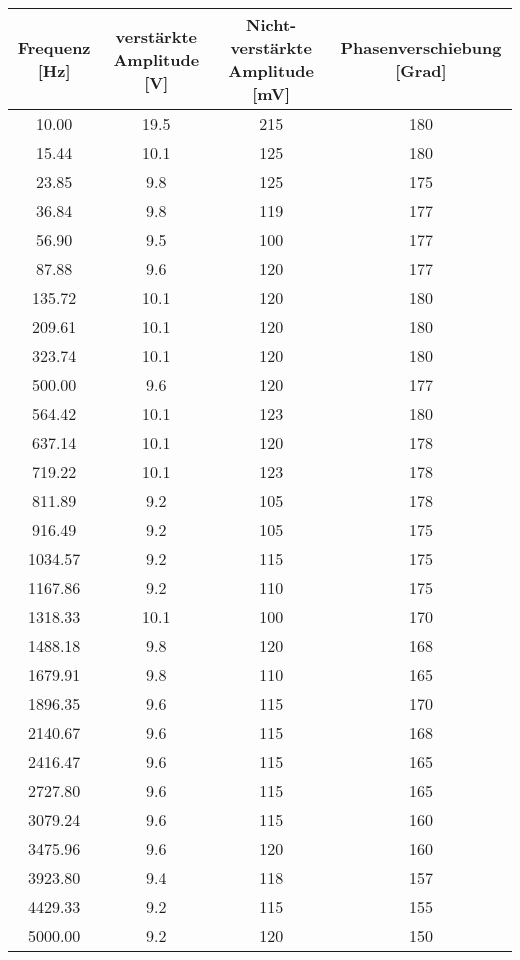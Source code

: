 \begin{tabular}{cccc}
    \toprule
    Frequenz [Hz] & verstärkte Amplitude [V] & Nicht-verstärkte Amplitude [mV] & Phasenverschiebung [Grad]\\
    \midrule
    10.00 & 19.5 & 215 & 180 \\
    15.44 & 10.1 & 125 & 180 \\
    23.85 & 9.8 & 125 & 175 \\
    36.84 & 9.8 & 119 & 177 \\
    56.90 & 9.5 & 100 & 177 \\
    87.88 & 9.6 & 120 & 177 \\
    135.72 & 10.1 & 120 & 180 \\
    209.61 & 10.1 & 120 & 180 \\
    323.74 & 10.1 & 120 & 180 \\
    500.00 & 9.6 & 120 & 177 \\
    564.42 & 10.1 & 123 & 180 \\
    637.14 & 10.1 & 120 & 178 \\
    719.22 & 10.1 & 123 & 178 \\
    811.89 & 9.2 & 105 & 178 \\
    916.49 & 9.2 & 105 & 175 \\
    1034.57 & 9.2 & 115 & 175 \\
    1167.86 & 9.2 & 110 & 175 \\
    1318.33 & 10.1 & 100 & 170 \\
    1488.18 & 9.8 & 120 & 168 \\
    1679.91 & 9.8 & 110 & 165 \\
    1896.35 & 9.6 & 115 & 170 \\
    2140.67 & 9.6 & 115 & 168 \\
    2416.47 & 9.6 & 115 & 165 \\
    2727.80 & 9.6 & 115 & 165 \\
    3079.24 & 9.6 & 115 & 160 \\
    3475.96 & 9.6 & 120 & 160 \\
    3923.80 & 9.4 & 118 & 157 \\
    4429.33 & 9.2 & 115 & 155 \\
    5000.00 & 9.2 & 120 & 150 \\
    \bottomrule
\end{tabular}
